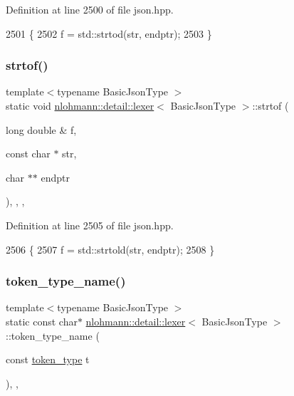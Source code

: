 Definition at line 2500 of file json.\+hpp.


\begin{DoxyCode}
2501     \{
2502         f = std::strtod(str, endptr);
2503     \}
\end{DoxyCode}
\mbox{\label{classnlohmann_1_1detail_1_1lexer_a0e28dda9a1e007d55d03e8d39dd3b9fa}} 
\subsubsection{\texorpdfstring{strtof()}{strtof()}\hspace{0.1cm}{\footnotesize\ttfamily [3/3]}}
{\footnotesize\ttfamily template$<$typename Basic\+Json\+Type $>$ \\
static void \hyperlink{classnlohmann_1_1detail_1_1lexer}{nlohmann\+::detail\+::lexer}$<$ Basic\+Json\+Type $>$\+::strtof (\begin{DoxyParamCaption}\item[{long double \&}]{f,  }\item[{const char $\ast$}]{str,  }\item[{char $\ast$$\ast$}]{endptr }\end{DoxyParamCaption})\hspace{0.3cm}{\ttfamily [inline]}, {\ttfamily [static]}, {\ttfamily [private]}, {\ttfamily [noexcept]}}



Definition at line 2505 of file json.\+hpp.


\begin{DoxyCode}
2506     \{
2507         f = std::strtold(str, endptr);
2508     \}
\end{DoxyCode}
\mbox{\label{classnlohmann_1_1detail_1_1lexer_ae514e2005f0ce185f1ad366139e541e8}} 
\subsubsection{\texorpdfstring{token\+\_\+type\+\_\+name()}{token\_type\_name()}}
{\footnotesize\ttfamily template$<$typename Basic\+Json\+Type $>$ \\
static const char$\ast$ \hyperlink{classnlohmann_1_1detail_1_1lexer}{nlohmann\+::detail\+::lexer}$<$ Basic\+Json\+Type $>$\+::token\+\_\+type\+\_\+name (\begin{DoxyParamCaption}\item[{const \hyperlink{classnlohmann_1_1detail_1_1lexer_a3f313cdbe187cababfc5e06f0b69b098}{token\+\_\+type}}]{t }\end{DoxyParamCaption})\hspace{0.3cm}{\ttfamily [inline]}, {\ttfamily [static]}, {\ttfamily [noexcept]}}



